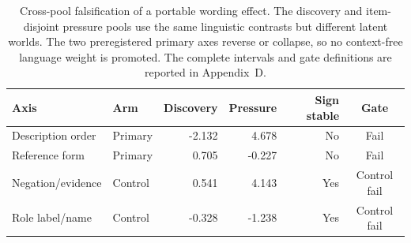 \begin{table}[H]
\centering
\footnotesize
\setlength{\tabcolsep}{3pt}
\begin{tabularx}{\columnwidth}{Xlrrrc}
\toprule
Axis & Arm & Discovery & Pressure & Sign stable & Gate \\
\midrule
Description order & Primary & -2.132 & 4.678 & No & Fail \\
Reference form & Primary & 0.705 & -0.227 & No & Fail \\
Negation/evidence & Control & 0.541 & 4.143 & Yes & Control fail \\
Role label/name & Control & -0.328 & -1.238 & Yes & Control fail \\
\bottomrule
\end{tabularx}
\caption{Cross-pool falsification of a portable wording effect. The discovery
and item-disjoint pressure pools use the same linguistic contrasts but different
latent worlds. The two preregistered primary axes reverse or collapse, so no
context-free language weight is promoted. The complete intervals and gate
definitions are reported in Appendix~D.}
\label{tab:main-cross-pool}
\end{table}
